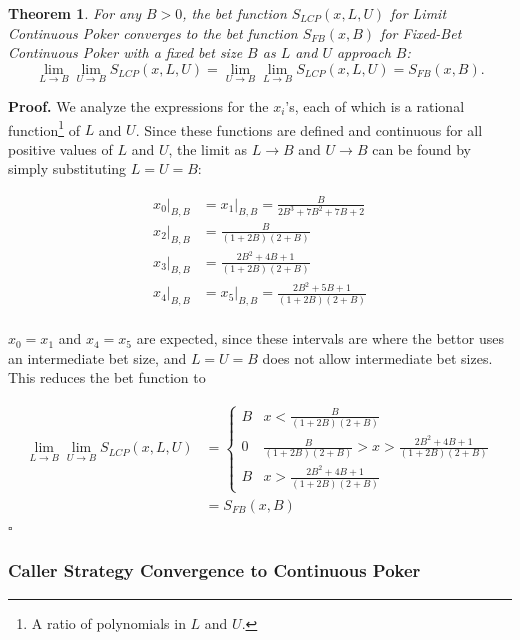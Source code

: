 \documentclass[a4paper,12pt]{article}
\theoremstyle{plain}
\newtheorem{theorem}{Theorem}[section]
\theoremstyle{definition}
\newenvironment{customproof}[1][Proof]{\noindent\textbf{#1.} }{\hfill$\square$\vspace{1em}}
\begin{document}
\begin{theorem}
	 For any $B > 0$, the bet function $S_{LCP}(x, L, U)$ for Limit Continuous Poker converges to the bet function $S_{FB}(x, B)$ for Fixed-Bet Continuous Poker with a fixed bet size $B$ as $L$ and $U$ approach $B$:
\[
\lim_{L \to B} \lim_{U \to B} S_{LCP}(x, L, U) = \lim_{U \to B} \lim_{L \to B} S_{LCP}(x, L, U) = S_{FB}(x, B).
\]
\end{theorem}

\begin{customproof}
We analyze the expressions for the $x_i$'s, each of which is a rational function\footnote{A ratio of polynomials in $L$ and $U$.} of $L$ and $U$. Since these functions are defined and continuous for all positive values of $L$ and $U$, the limit as $L \to B$ and $U \to B$ can be found by simply substituting $L = U = B$:

\begin{align*}
    x_0|_{B,B} & = x_1|_{B,B} = \frac{B}{2 B^3+7 B^2+7 B+2} \\
    x_2|_{B,B} & = \frac{B}{(1+2B)(2+B)} \\
    x_3|_{B,B} & = \frac{2 B^2+4 B+1}{(1+2B)(2+B)} \\
    x_4|_{B,B} & = x_5|_{B,B} = \frac{2 B^2+5 B+1}{(1+2B)(2+B)} \\
\end{align*}

$x_0 = x_1$ and $x_4 = x_5$ are expected, since these intervals are where the bettor uses an intermediate bet size, and $L=U=B$ does not allow intermediate bet sizes. This reduces the bet function to 

\begin{align*}
    \lim_{L \to B} \lim_{U \to B} S_{LCP}(x, L, U) & = \begin{cases}
    B & x < \frac{B}{(1+2B)(2+B)}\\
    0 & \frac{B}{(1+2B)(2+B)} > x > \frac{2 B^2+4 B+1}{(1+2B)(2+B)}\\
    B & x > \frac{2 B^2+4 B+1}{(1+2B)(2+B)}
    \end{cases}\\
    &= S_{FB}(x, B)
\end{align*}
\end{customproof}

\subsubsection{Caller Strategy Convergence to Continuous Poker}
\end{document}
